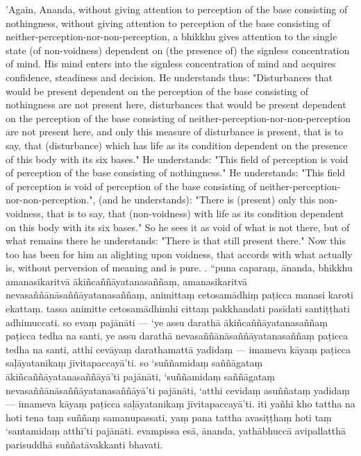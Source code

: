\documentclass[11pt]{article}
\begin{document}
\begin{paracol}{2}
\begin{column}
\switchcolumn*
'Again, Ananda, without giving attention to perception of the base consisting of nothingness, without giving attention to perception of the base consisting of neither-perception-nor-non-perception, a bhikkhu gives attention to the single state (of non-voidness) dependent on (the presence of) the signless concentration of mind. His mind enters into the signless concentration of mind and acquires confidence, steadiness and decision. He understands thus: "Disturbances that would be present dependent on the perception of the base consisting of nothingness are not present here, disturbances that would be present dependent on the perception of the base consisting of neither-perception-nor-non-perception are not present here, and only this measure of disturbance is present, that is to say, that (disturbance) which has life as its condition dependent on the presence of this body with its six bases." He understands: "This field of perception is void of perception of the base consisting of nothingness." He understands: "This field of perception is void of perception of the base consisting of neither-perception-nor-non-perception.", (and he understands): "There is (present) only this non-voidness, that is to say, that (non-voidness) with life as its condition dependent on this body with its six bases." So he sees it as void of what is not there, but of what remains there he understands: "There is that still present there." Now this too has been for him an alighting upon voidness, that accords with what actually is, without perversion of meaning and is pure.
 . “puna caparaṃ, ānanda, bhikkhu amanasikaritvā ākiñcaññāyatanasaññaṃ, amanasikaritvā nevasaññānāsaññāyatanasaññaṃ, animittaṃ cetosamādhiṃ paṭicca manasi karoti ekattaṃ. tassa animitte cetosamādhimhi cittaṃ pakkhandati pasīdati santiṭṭhati adhimuccati. so evaṃ pajānāti — ‘ye assu darathā ākiñcaññāyatanasaññaṃ paṭicca tedha na santi, ye assu darathā nevasaññānāsaññāyatanasaññaṃ paṭicca tedha na santi, atthi cevāyaṃ darathamattā yadidaṃ — imameva kāyaṃ paṭicca saḷāyatanikaṃ jīvitapaccayā’ti. so ‘suññamidaṃ saññāgataṃ ākiñcaññāyatanasaññāyā’ti pajānāti, ‘suññamidaṃ saññāgataṃ nevasaññānāsaññāyatanasaññāyā’ti pajānāti, ‘atthi cevidaṃ asuññataṃ yadidaṃ — imameva kāyaṃ paṭicca saḷāyatanikaṃ jīvitapaccayā’ti. iti yañhi kho tattha na hoti tena taṃ suññaṃ samanupassati, yaṃ pana tattha avasiṭṭhaṃ hoti taṃ ‘santamidaṃ atthī’ti pajānāti. evampissa esā, ānanda, yathābhuccā avipallatthā parisuddhā suññatāvakkanti bhavati.
\switchcolumn*

\end{column}
\end{paracol}
\end{document}
